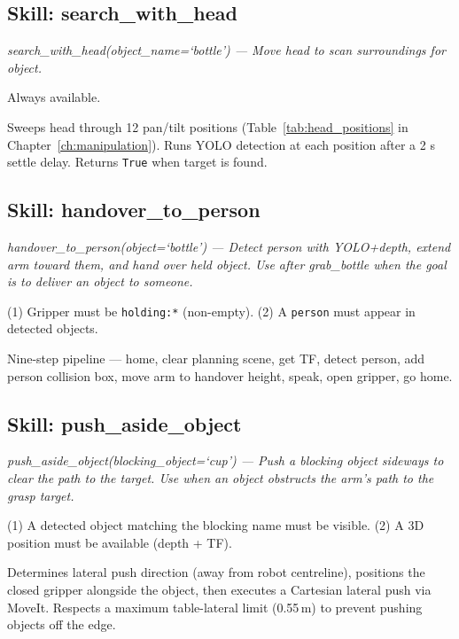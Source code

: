 \subsection{Skill: search\_with\_head}

\begin{description}[noitemsep]
  \item[Description shown to VLM:] \textit{search\_with\_head(object\_name=`bottle')
    — Move head to scan surroundings for object.}
  \item[Affordance check:] Always available.
  \item[Execution:] Sweeps head through 12 pan/tilt positions (Table~\ref{tab:head_positions}
    in Chapter~\ref{ch:manipulation}). Runs YOLO detection at each position after
    a 2 s settle delay. Returns \texttt{True} when target is found.
\end{description}

\subsection{Skill: handover\_to\_person}

\begin{description}[noitemsep]
  \item[Description shown to VLM:] \textit{handover\_to\_person(object=`bottle')
    — Detect person with YOLO+depth, extend arm toward them, and hand over held
    object. Use after grab\_bottle when the goal is to deliver an object to someone.}
  \item[Affordance check:]
    (1) Gripper must be \texttt{holding:*} (non-empty).
    (2) A \texttt{person} must appear in detected objects.
  \item[Execution:] Nine-step pipeline — home, clear planning scene, get TF,
    detect person, add person collision box, move arm to handover height,
    speak, open gripper, go home.
\end{description}

\subsection{Skill: push\_aside\_object}

\begin{description}[noitemsep]
  \item[Description shown to VLM:] \textit{push\_aside\_object(blocking\_object=\textquoteleft cup\textquoteright)
    --- Push a blocking object sideways to clear the path to the target.
    Use when an object obstructs the arm's path to the grasp target.}
  \item[Affordance check:]
    (1) A detected object matching the blocking name must be visible.
    (2) A 3D position must be available (depth + TF).
  \item[Execution:] Determines lateral push direction (away from robot centreline),
    positions the closed gripper alongside the object, then executes a Cartesian
    lateral push via MoveIt.
    Respects a maximum table-lateral limit (0.55\,m) to prevent pushing objects
    off the edge.
\end{description}

